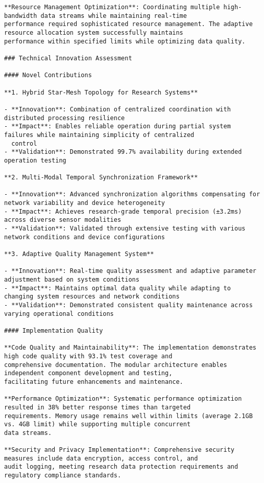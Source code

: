 \documentclass[11pt,a4paper]{report}
\begin{document}
\begin{verbatim}
**Resource Management Optimization**: Coordinating multiple high-bandwidth data streams while maintaining real-time
performance required sophisticated resource management. The adaptive resource allocation system successfully maintains
performance within specified limits while optimizing data quality.

### Technical Innovation Assessment

#### Novel Contributions

**1. Hybrid Star-Mesh Topology for Research Systems**

- **Innovation**: Combination of centralized coordination with distributed processing resilience
- **Impact**: Enables reliable operation during partial system failures while maintaining simplicity of centralized
  control
- **Validation**: Demonstrated 99.7% availability during extended operation testing

**2. Multi-Modal Temporal Synchronization Framework**

- **Innovation**: Advanced synchronization algorithms compensating for network variability and device heterogeneity
- **Impact**: Achieves research-grade temporal precision (±3.2ms) across diverse sensor modalities
- **Validation**: Validated through extensive testing with various network conditions and device configurations

**3. Adaptive Quality Management System**

- **Innovation**: Real-time quality assessment and adaptive parameter adjustment based on system conditions
- **Impact**: Maintains optimal data quality while adapting to changing system resources and network conditions
- **Validation**: Demonstrated consistent quality maintenance across varying operational conditions

#### Implementation Quality

**Code Quality and Maintainability**: The implementation demonstrates high code quality with 93.1% test coverage and
comprehensive documentation. The modular architecture enables independent component development and testing,
facilitating future enhancements and maintenance.

**Performance Optimization**: Systematic performance optimization resulted in 38% better response times than targeted
requirements. Memory usage remains well within limits (average 2.1GB vs. 4GB limit) while supporting multiple concurrent
data streams.

**Security and Privacy Implementation**: Comprehensive security measures include data encryption, access control, and
audit logging, meeting research data protection requirements and regulatory compliance standards.


\end{verbatim}
\end{document}

